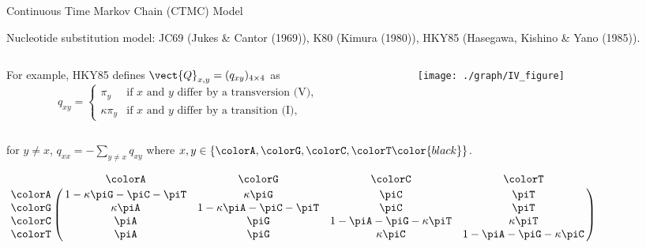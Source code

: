 \documentclass{beamer}
\begin{document}
\begin{frame}{Continuous Time Markov Chain (CTMC) Model}

\vspace{0.2cm}
Nucleotide substitution model: JC69
(Jukes \& Cantor (1969)), K80 (Kimura (1980)),
HKY85 (Hasegawa, Kishino \& Yano (1985)).
\\
\begin{columns}

\begin{column}{0.8\textwidth}
\hspace{0.1cm}
For example, HKY85 defines
$\vect{Q}_{x,y} = (q_{xy})_{4\times 4}$ as
\[
q_{xy} =
\left\{
\begin{array}{ll}
  \pi_y & \mbox{if $x$ and $y$ differ by a transversion (V),}      \\
  \kappa \pi_y & \mbox{if $x$ and $y$ differ by a transition (I),}
\end{array}
\right.
\]
\end{column}

\hspace{-0.5cm}

\begin{column}{0.2\textwidth}
\begin{figure}
  \texttt{[image: ./graph/IV\_figure]}
\end{figure}
\end{column}

\end{columns}

for $y \neq x$, $q_{xx} = -\sum_{y \neq x} q_{xy}$ where
$x, y \in \{\colorA, \colorG, \colorC, \colorT \color{black} \}$.

\vspace{0.3cm}
{\scriptsize
$
\bordermatrix{
~       &  \colorA                   & \colorG                & \colorC                & \colorT                \cr
\colorA & 1-\kappa\piG - \piC - \piT & \kappa\piG             & \piC                   & \piT                   \cr
\colorG & \kappa\piA                 & 1-\kappa\piA-\piC-\piT & \piC                   & \piT                   \cr
\colorC & \piA                       & \piG                   & 1-\piA-\piG-\kappa\piT & \kappa\piT             \cr
\colorT & \piA                       & \piG                   & \kappa\piC             & 1-\piA-\piG-\kappa\piC \cr
}
$
}

\vspace{0.2cm}
\begin{center}
\end{center}

\end{frame}
\end{document}
